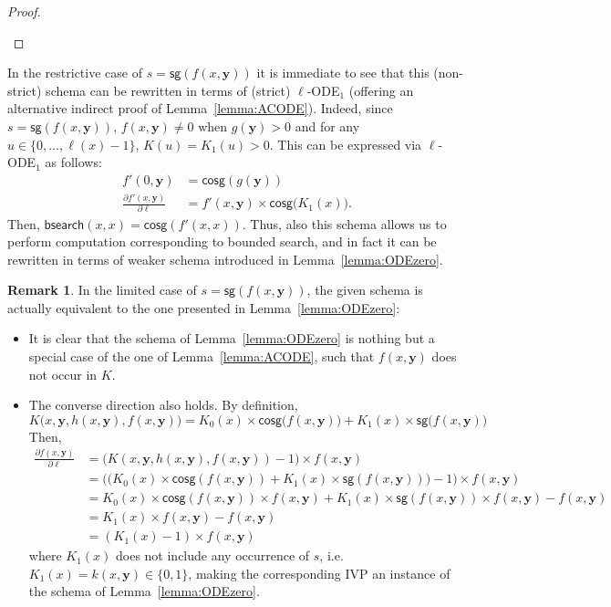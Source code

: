 \documentclass[11pt, oneside]{article}
\newenvironment{toappendix}{}{}
\newcommand{\fun}[1]{\mathsf{#1}}
\newcommand{\tu}[1]{\mathbf{#1}}
\theoremstyle{definition}
\newtheorem{remark}{Remark}
\begin{document}
\begin{toappendix}
\begin{proof}
\begin{itemize}
    \end{itemize}
\end{proof}
%
In the restrictive case of $s=\fun{sg}(f(x, \tu y))$ it is immediate to see that this (non-strict) schema can be rewritten in terms of (strict) $\ell$-ODE$_1$ (offering an alternative indirect proof of Lemma~\ref{lemma:ACODE}).
%
Indeed, since $s=\fun{sg}(f(x, \tu y))$, $f(x, \tu y) \neq 0$ when $g(\tu y)>0$ and for any $u\in \{0, \dots, \ell(x)-1\}$, $K(u)=K_1(u)>0$.
%
This can be expressed via $\ell$-ODE$_1$ as follows:
\begin{align*}
    f'(0, \tu y) &= \fun{cosg}(g(\tu y)) \\
    \frac{\partial f'(x, \tu y)}{\partial \ell} &= f'(x, \tu y) \times \fun{cosg}\big(K_1(x)\big).
\end{align*}
Then, $\fun{bsearch}(x,x)=\fun{cosg}(f'(x,x))$.
%
Thus, also this schema allows us to perform computation corresponding to bounded search, and in fact it can be rewritten in terms of weaker schema introduced in Lemma~\ref{lemma:ODEzero}.

\begin{remark} %
In the limited case of $s=\fun{sg}(f(x,\tu y))$, the given schema is actually equivalent to the one presented in Lemma~\ref{lemma:ODEzero}:
\begin{itemize}
    \itemsep0em
    \item It is clear that the schema of Lemma~\ref{lemma:ODEzero} is nothing but a special case of the one of Lemma~\ref{lemma:ACODE}, such that $f(x, \tu y)$ does not occur in $K$.
    \item The converse direction also holds.
    By definition, 
    $$
    K\big(x, \tu y, h(x, \tu y), f(x, \tu y)\big) = K_0(x) \times \fun{cosg}\big(f(x, \tu y)\big) + K_1(x) \times \fun{sg}\big(f(x, \tu y)\big) 
    $$
    Then,
    \begin{align*}
        \frac{\partial f(x,\tu y)}{\partial \ell} &= \big(K(x, \tu y, h(x, \tu y), f(x, \tu y)) - 1\big) \times f(x, \tu y) \\
        &= \big(\big(K_0(x) \times \fun{cosg}(f(x, \tu y)) + K_1(x) \times \fun{sg}(f(x,\tu y))\big)-1\big) \times f(x, \tu y) \\
        &= K_0(x) \times \fun{cosg}(f(x, \tu y)) \times f(x, \tu y) + K_1(x) \times \fun{sg}(f(x, \tu y))\times f(x, \tu y) - f(x, \tu y)
        \\
        &= K_1(x) \times f(x, \tu y) - f(x, \tu y) \\
        &= (K_1(x)-1) \times f(x, \tu y)
    \end{align*}
    where $K_1(x)$ does not include any occurrence of $s$, i.e. $K_1(x) = k(x, \tu y) \in \{0,1\}$, making the corresponding IVP an instance of the schema of Lemma~\ref{lemma:ODEzero}.
\end{itemize}
\end{remark}
\end{toappendix}
\end{document}

